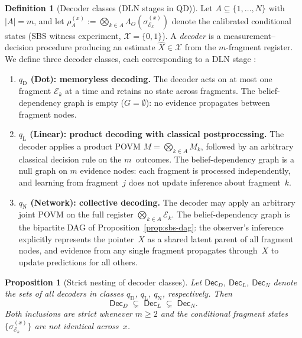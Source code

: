 \documentclass[11pt]{article}
\newcommand{\cE}{\mathcal{E}}
\newcommand{\cX}{\mathcal{X}}
\newcommand{\1}{\mathbf{1}}
\theoremstyle{definition}
\newtheorem{definition}{Definition}
\theoremstyle{plain}
\newtheorem{proposition}{Proposition}
\begin{document}
\begin{definition}[Decoder classes (DLN stages in QD)]
\label{def:q-states}
Let $A\subseteq\{1,\dots,N\}$ with $|A|=m$, and let
$\rho_A^{(x)} := \bigotimes_{k\in A}\Lambda_O(\sigma^{(x)}_{\cE_k})$
denote the calibrated conditional states (SBS witness experiment,
$\cX=\{0,1\}$).
A \emph{decoder} is a measurement--decision procedure producing an
estimate $\widehat{X}\in\cX$ from the $m$-fragment register.
We define three decoder classes, each corresponding to a DLN stage
\citep[Sec.~2.1]{WuDLNCompression2026preprint}:
%
\begin{enumerate}[leftmargin=2.2em,label=(\roman*)]
\item \textbf{$q_{\mathrm{D}}$ (Dot): memoryless decoding.}
The decoder acts on at most one fragment $\cE_k$ at a time and retains
no state across fragments.
The belief-dependency graph is empty ($G=\emptyset$): no evidence
propagates between fragment nodes.

\item \textbf{$q_{\mathrm{L}}$ (Linear): product decoding with
classical postprocessing.}
The decoder applies a product POVM $M=\bigotimes_{k\in A}M_k$, followed
by an arbitrary classical decision rule on the $m$~outcomes.
The belief-dependency graph is a null graph on $m$ evidence nodes: each
fragment is processed independently, and learning from fragment~$j$ does
not update inference about fragment~$k$.

\item \textbf{$q_{\mathrm{N}}$ (Network): collective decoding.}
The decoder may apply an arbitrary joint POVM on the full register
$\bigotimes_{k\in A}\cE_k$.
The belief-dependency graph is the bipartite DAG of
Proposition~\ref{prop:sbs-dag}: the observer's inference explicitly
represents the pointer~$X$ as a shared latent parent of all fragment
nodes, and evidence from any single fragment propagates through~$X$ to
update predictions for all others.
\end{enumerate}
\end{definition}


\begin{proposition}[Strict nesting of decoder classes]
\label{prop:nesting}
Let $\mathsf{Dec}_D$, $\mathsf{Dec}_L$, $\mathsf{Dec}_N$ denote the
sets of all decoders in classes $q_{\mathrm{D}}$, $q_{\mathrm{L}}$,
$q_{\mathrm{N}}$, respectively.  Then
\[
  \mathsf{Dec}_D \;\subsetneq\; \mathsf{Dec}_L
                  \;\subsetneq\; \mathsf{Dec}_N.
\]
Both inclusions are strict whenever $m\ge 2$ and the conditional
fragment states $\{\sigma^{(x)}_{\cE_k}\}$ are not identical
across~$x$.
\end{proposition}
\end{document}
